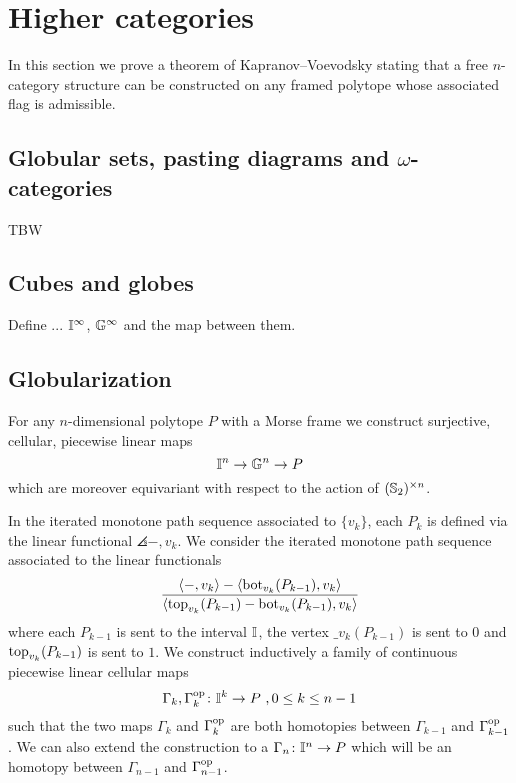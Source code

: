 
\section{Higher categories}

In this section we prove a theorem of Kapranov--Voevodsky \cite{kapranov1991polycategory} stating that a free $n$-category structure can be constructed on any framed polytope whose associated flag is admissible.

\subsection{Globular sets, pasting diagrams and $\omega$-categories}

TBW

\subsection{Cubes and globes}

Define ... $\mathbb{I}^\infty$, $\mathbb{G}^\infty$ and the map between them.

\subsection{Globularization} \label{ss:globularization}

For any $n$-dimensional polytope $P$ with a Morse frame we construct surjective, cellular, piecewise linear maps
\[
\mathbb{I}^n \to \mathbb{G}^n \to P
\]
which are moreover equivariant with respect to the action of $(\mathbb{S}_2)^{\times n}$.

In the iterated monotone path sequence associated to $\{v_k\}$, each $P_k$ is defined via the linear functional $\angles{-,v_k}$.
We consider the iterated monotone path sequence associated to the linear functionals
\begin{equation} \label{eq:new-projection}
	\frac{\langle-,v_k\rangle-\langle\operatorname{bot}_{v_k}(P_{k-1}),v_k\rangle}{\langle\operatorname{top}_{v_k}(P_{k-1})-\operatorname{bot}_{v_k}(P_{k-1}),v_k\rangle}
\end{equation}
where each $P_{k-1}$ is sent to the interval $\mathbb{I}$, the vertex $\bm_{v_k}(P_{k-1})$ is sent to $0$ and $\operatorname{top}_{v_k}(P_{k-1})$ is sent to $1$.
We construct inductively a family of continuous piecewise linear cellular maps
\[
\Gamma_k, \Gamma_k^{\mathrm{op}} \colon \mathbb{I}^k \to P \ , 0 \leq k \leq n-1
\]
such that the two maps $\Gamma_k$ and $\Gamma_k^{\mathrm{op}}$ are both homotopies between $\Gamma_{k-1}$ and $\Gamma_{k-1}^{\mathrm{op}}$.
We can also extend the construction to a $\Gamma_n \colon \mathbb{I}^n \to P$ which will be an homotopy between $\Gamma_{n-1}$ and $\Gamma_{n-1}^{\mathrm{op}}$.


